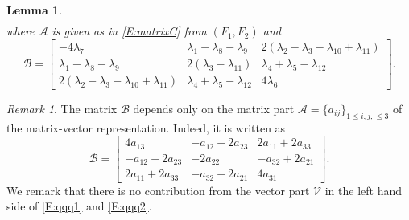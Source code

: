 \documentclass[11pt,a4paper,oneside]{amsart}
\theoremstyle{plain}
\newtheorem{lemma}[theorem]{Lemma}
\theoremstyle{remark}
\newtheorem{remark}[theorem]{Remark}
\numberwithin{equation}{section}
\def\le{\leqslant}
\theoremstyle{definition}
\begin{document}
\begin{lemma}
\begin{equation}
\begin{aligned}
\end{aligned}
\end{equation}
where $\mathscr{A}$ is given as in \eqref{E:matrixC} from $(F_1,F_2)$ and 
\begin{equation}\label{E:Bform}
	\mathscr{B} =\begin{bmatrix}
	-4\lambda_7 
	&
	\lambda_1 - \lambda_8 - \lambda_9 
	&
	2 (\lambda_2-\lambda_3-\lambda_{10}+\lambda_{11}) 
	\\
	\lambda_1 - \lambda_8 - \lambda_9 
	& 
	2(\lambda_3 - \lambda_{11})
	&
	\lambda_4+\lambda_5 - \lambda_{12} 
	\\
	2 (\lambda_2-\lambda_3-\lambda_{10}+\lambda_{11}) 
	& 
	\lambda_4+\lambda_5 - \lambda_{12} 
	&
	4 \lambda_6
	\end{bmatrix}.
\end{equation}
\end{lemma}
\begin{remark}
The matrix $\mathscr{B}$ depends only on the matrix part $\mathscr{A}=\{a_{ij}\}_{1 \le i,j, \le 3}$ of the matrix-vector representation.
Indeed, it is written as
\[
	\mathscr{B} =\begin{bmatrix}
	4 a_{13}%
	&
	-a_{12}+2a_{23} %
	&
	2a_{11}+2a_{33}  %
	\\
	-a_{12}+2a_{23} %
	& 
	-2 a_{22} %
	&
	-a_{32} + 2a_{21} %
	\\
	2a_{11}+2a_{33} %
	& 
	-a_{32} + 2a_{21} %
	&
	4 a_{31} %
	\end{bmatrix}.
\]
We remark that there is no contribution from the vector part $\mathscr{V}$ in the left hand side of \eqref{E:qqq1} and \eqref{E:qqq2}.
\end{remark}
\end{document}
